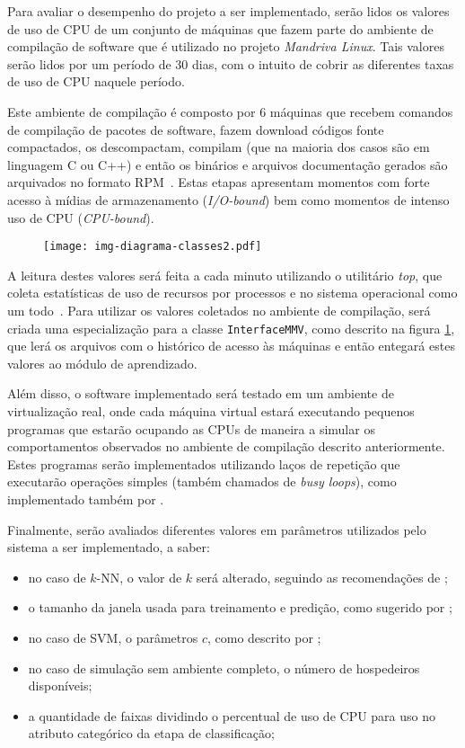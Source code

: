 Para avaliar o desempenho do projeto a ser implementado, serão lidos os
valores de uso de CPU de um conjunto de máquinas que fazem parte do
ambiente de compilação de software que é utilizado no projeto
\emph{Mandriva Linux}. Tais valores serão lidos por um período de 30 dias,
com o intuito de cobrir as diferentes taxas de uso de CPU naquele período.

Este ambiente de compilação é composto por $6$ máquinas que recebem
comandos de compilação de pacotes de software, fazem download códigos fonte
compactados, os descompactam, compilam (que na maioria dos casos são em
linguagem C ou C++) e então os binários e arquivos documentação gerados são
arquivados no formato RPM~\cite{ewing1996rpm}. Estas etapas apresentam
momentos com forte acesso à mídias de armazenamento (\emph{I/O-bound}) bem
como momentos de intenso uso de CPU (\emph{CPU-bound}).

\begin{figure}[htp]
\centering
\texttt{[image: img-diagrama-classes2.pdf]}
\label{fig:diagramaclasses2}
\end{figure}

A leitura destes valores será feita a cada minuto utilizando o utilitário
\emph{top}, que coleta estatísticas de uso de recursos por processos e no
sistema operacional como um todo~\cite{andresen2004monitoring}. Para utilizar
os valores coletados no ambiente de compilação, será criada uma especialização
para a classe \texttt{InterfaceMMV}, como descrito na figura
\ref{fig:diagramaclasses2}, que lerá os arquivos com o histórico de acesso às
máquinas e então entegará estes valores ao módulo de aprendizado.

Além disso, o software implementado será testado em um ambiente de
virtualização real, onde cada máquina virtual estará executando pequenos
programas que estarão ocupando as CPUs de maneira a simular os
comportamentos observados no ambiente de compilação descrito anteriormente.
Estes programas serão implementados utilizando laços de repetição que
executarão operações simples (também chamados de \emph{busy loops}), como
implementado também por .

Finalmente, serão avaliados diferentes valores em parâmetros utilizados
pelo sistema a ser implementado, a saber:

\begin{itemize}
  \item no caso de $k$-NN, o valor de $k$ será alterado, seguindo as
        recomendações de ;
   \item o tamanho da janela usada para treinamento e predição, como sugerido
        por ;
   \item no caso de SVM, o parâmetros $c$, como descrito por ;
   \item no caso de simulação sem ambiente completo, o número de hospedeiros disponíveis;
   \item a quantidade de faixas dividindo o percentual de uso de CPU para
         uso no atributo categórico da etapa de classificação;
\end{itemize}

